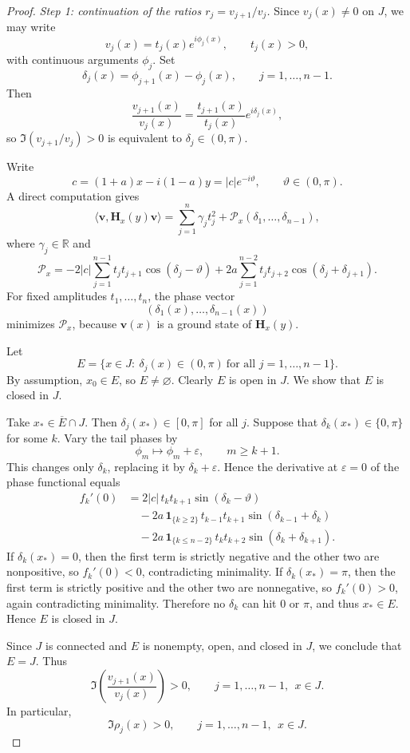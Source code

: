 \documentclass[11pt]{article}
\numberwithin{equation}{section}
\newcommand{\R}{\mathbb R}
\newcommand{\Hmat}{\mathbf H}
\begin{document}
\begin{proof}
\emph{Step 1: continuation of the ratios \(r_j=v_{j+1}/v_j\).}
Since \(v_j(x)\neq0\) on \(J\), we may write
\[
v_j(x)=t_j(x)e^{i\phi_j(x)},
\qquad
t_j(x)>0,
\]
with continuous arguments \(\phi_j\).  Set
\[
\delta_j(x)=\phi_{j+1}(x)-\phi_j(x),
\qquad j=1,\dots,n-1.
\]
Then
\[
\frac{v_{j+1}(x)}{v_j(x)}
=
\frac{t_{j+1}(x)}{t_j(x)}e^{i\delta_j(x)},
\]
so \(\Im(v_{j+1}/v_j)>0\) is equivalent to \(\delta_j\in(0,\pi)\).

Write
\[
c=(1+a)x-i(1-a)y=|c|e^{-i\vartheta},
\qquad
\vartheta\in(0,\pi).
\]
A direct computation gives
\[
\langle \bm v,\Hmat_x(y)\bm v\rangle
=
\sum_{j=1}^n \gamma_j t_j^2+\mathcal P_x(\delta_1,\dots,\delta_{n-1}),
\]
where \(\gamma_j\in\R\) and
\[
\mathcal P_x
=
-2|c|\sum_{j=1}^{n-1}t_jt_{j+1}\cos(\delta_j-\vartheta)
+
2a\sum_{j=1}^{n-2}t_jt_{j+2}\cos(\delta_j+\delta_{j+1}).
\]
For fixed amplitudes \(t_1,\dots,t_n\), the phase vector
\[
(\delta_1(x),\dots,\delta_{n-1}(x))
\]
minimizes \(\mathcal P_x\), because \(\bm v(x)\) is a ground state of
\(\Hmat_x(y)\).

Let
\[
E=
\{x\in J:\ \delta_j(x)\in(0,\pi)\ \text{for all }j=1,\dots,n-1\}.
\]
By assumption, \(x_0\in E\), so \(E\neq\varnothing\).  Clearly \(E\) is open in \(J\).
We show that \(E\) is closed in \(J\).

Take \(x_*\in\overline E\cap J\).  Then \(\delta_j(x_*)\in[0,\pi]\) for all \(j\).
Suppose that \(\delta_k(x_*)\in\{0,\pi\}\) for some \(k\).  Vary the tail phases by
\[
\phi_m\mapsto \phi_m+\varepsilon,\qquad m\ge k+1.
\]
This changes only \(\delta_k\), replacing it by \(\delta_k+\varepsilon\).  Hence the
derivative at \(\varepsilon=0\) of the phase functional equals
\begin{align*}
f_k'(0)
&=
2|c|\,t_kt_{k+1}\sin(\delta_k-\vartheta) \\
&\quad
-2a\,\mathbf 1_{\{k\ge2\}}\,t_{k-1}t_{k+1}\sin(\delta_{k-1}+\delta_k) \\
&\quad
-2a\,\mathbf 1_{\{k\le n-2\}}\,t_kt_{k+2}\sin(\delta_k+\delta_{k+1}).
\end{align*}
If \(\delta_k(x_*)=0\), then the first term is strictly negative and the other two are
nonpositive, so \(f_k'(0)<0\), contradicting minimality.  If \(\delta_k(x_*)=\pi\),
then the first term is strictly positive and the other two are nonnegative, so
\(f_k'(0)>0\), again contradicting minimality.  Therefore no \(\delta_k\) can hit
\(0\) or \(\pi\), and thus \(x_*\in E\).  Hence \(E\) is closed in \(J\).

Since \(J\) is connected and \(E\) is nonempty, open, and closed in \(J\), we conclude
that \(E=J\).  Thus
\[
\Im\!\left(\frac{v_{j+1}(x)}{v_j(x)}\right)>0,
\qquad
j=1,\dots,n-1,\ \ x\in J.
\]
In particular,
\[
\Im \rho_j(x)>0,
\qquad
j=1,\dots,n-1,\ \ x\in J.
\]


\end{proof}
\end{document}
